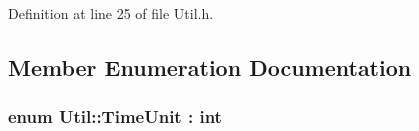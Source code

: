Definition at line 25 of file Util.\-h.



\subsection{Member Enumeration Documentation}
\hypertarget{class_util_a28504cc2fecc9aa47154cba4e625ec6f}{
\subsubsection[{Time\-Unit}]{\setlength{\rightskip}{0pt plus 5cm}enum {\bf Util\-::\-Time\-Unit} \-: int\hspace{0.3cm}{\ttfamily [strong]}}}\label{class_util_a28504cc2fecc9aa47154cba4e625ec6f}
